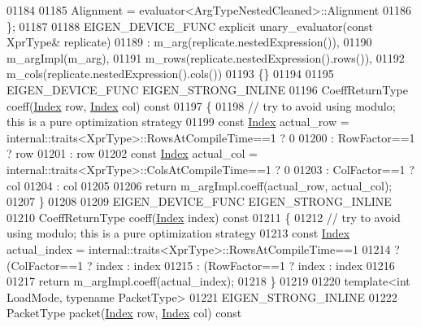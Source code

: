 \begin{DoxyCode}
01184     
01185     Alignment = evaluator<ArgTypeNestedCleaned>::Alignment
01186   \};
01187 
01188   EIGEN\_DEVICE\_FUNC \textcolor{keyword}{explicit} unary\_evaluator(\textcolor{keyword}{const} XprType& replicate)
01189     : m\_arg(replicate.nestedExpression()),
01190       m\_argImpl(m\_arg),
01191       m\_rows(replicate.nestedExpression().rows()),
01192       m\_cols(replicate.nestedExpression().cols())
01193   \{\}
01194  
01195   EIGEN\_DEVICE\_FUNC EIGEN\_STRONG\_INLINE
01196   CoeffReturnType coeff(\hyperlink{namespace_eigen_a62e77e0933482dafde8fe197d9a2cfde}{Index} row, \hyperlink{namespace_eigen_a62e77e0933482dafde8fe197d9a2cfde}{Index} col)\textcolor{keyword}{ const}
01197 \textcolor{keyword}{  }\{
01198     \textcolor{comment}{// try to avoid using modulo; this is a pure optimization strategy}
01199     \textcolor{keyword}{const} \hyperlink{namespace_eigen_a62e77e0933482dafde8fe197d9a2cfde}{Index} actual\_row = internal::traits<XprType>::RowsAtCompileTime==1 ? 0
01200                            : RowFactor==1 ? row
01201                            : row %
01202     \textcolor{keyword}{const} \hyperlink{namespace_eigen_a62e77e0933482dafde8fe197d9a2cfde}{Index} actual\_col = internal::traits<XprType>::ColsAtCompileTime==1 ? 0
01203                            : ColFactor==1 ? col
01204                            : col %
01205     
01206     \textcolor{keywordflow}{return} m\_argImpl.coeff(actual\_row, actual\_col);
01207   \}
01208   
01209   EIGEN\_DEVICE\_FUNC EIGEN\_STRONG\_INLINE
01210   CoeffReturnType coeff(\hyperlink{namespace_eigen_a62e77e0933482dafde8fe197d9a2cfde}{Index} index)\textcolor{keyword}{ const}
01211 \textcolor{keyword}{  }\{
01212     \textcolor{comment}{// try to avoid using modulo; this is a pure optimization strategy}
01213     \textcolor{keyword}{const} \hyperlink{namespace_eigen_a62e77e0933482dafde8fe197d9a2cfde}{Index} actual\_index = internal::traits<XprType>::RowsAtCompileTime==1
01214                                   ? (ColFactor==1 ?  index : index%
01215                                   : (RowFactor==1 ?  index : index%
01216     
01217     \textcolor{keywordflow}{return} m\_argImpl.coeff(actual\_index);
01218   \}
01219 
01220   \textcolor{keyword}{template}<\textcolor{keywordtype}{int} LoadMode, \textcolor{keyword}{typename} PacketType>
01221   EIGEN\_STRONG\_INLINE
01222   PacketType packet(\hyperlink{namespace_eigen_a62e77e0933482dafde8fe197d9a2cfde}{Index} row, \hyperlink{namespace_eigen_a62e77e0933482dafde8fe197d9a2cfde}{Index} col)\textcolor{keyword}{ const}

\end{DoxyCode}
